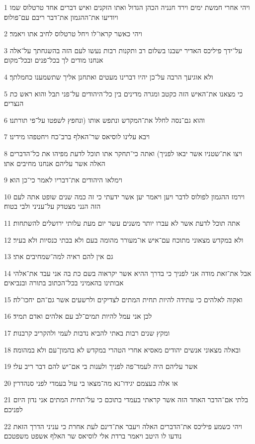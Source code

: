 \par 1 ויהי אחרי חמשת ימים וירד חנניה הכהן הגדול ואתו הזקנים ואיש דברים אחד טרטלוס שמו ויודיעו את־ההגמון את־דבר ריבם עם־פולוס׃
\par 2 ויהי כאשר קראו־לו ויחל טרטלוס לחיב אתו ויאמר׃
\par 3 על־ידך פיליכס האדיר ישבנו בשלום רב ותקנות רבות נעשו לעם הזה בהשגחתך על־אלה אנחנו מודים לך בכל־פנים ובכל־מקום׃
\par 4 ולא אוגיעך הרבה על־כן יהיו דברינו מעטים ואתחנן אליך שתשמענו כחמלתך׃
\par 5 כי מצאנו את־האיש הזה כקטב ומגרה מדינים בין כל־היהודים על־פני תבל והוא ראש כת הנצרים׃
\par 6 והוא גם־נסה לחלל את־המקדש ונתפש אותו (ונחפץ לשפטו על־פי תורתנו׃
\par 7 ויבא עלינו לוסיאס שר־האלף ברב־כח ויחטפהו מידינו׃
\par 8 ויצו את־שטניו אשר יבאו לפניך) ואתה כי־תחקר אתו תוכל לדעת מפיהו את כל־הדברים האלה אשר עליהם אנחנו מחיבים אתו׃
\par 9 וימלאו היהודים את־דבריו לאמר כי־כן הוא׃
\par 10 וירמז ההגמון לפולוס לדבר ויען ויאמר יען אשר ידעתי כי זה כמה שנים שופט אתה לעם הזה הנני מצטדק על־עניני ולבי בטוח׃
\par 11 אתה תוכל לדעת אשר לא עברו יותר משנים עשר יום מעת עלותי ירושלים להשתחות׃
\par 12 ולא במקדש מצאוני מתוכח עם־איש או־מעורר מהומה בעם ולא בבתי כנסיות ולא בעיר׃
\par 13 גם אין להם ראיה למה־שמחיבים אתי׃
\par 14 אבל את־זאת מודה אני לפניך כי בדרך ההיא אשר יקראוה בשם כת בה אני עבד את־אלהי אבותינו בהאמיני בכל־הכתוב בתורה ובנביאים׃
\par 15 ואקוה לאלהים כי עתידה להיות תחית המתים לצדיקים ולרשעים אשר גם־הם יחכו־לה׃
\par 16 לכן אני עמל להיות תמים־לב עם אלהים ואדם תמיד׃
\par 17 ומקץ שנים רבות באתי להביא נדבות לעמי ולהקריב קרבנות׃
\par 18 ובאלה מצאוני אנשים יהודים מאסיא אחרי הטהרי במקדש לא בהמון־עם ולא במהומה׃
\par 19 אשר עליהם היה לעמד־פה לפניך ולענות בי אם־יש להם דבר ריב עלי׃
\par 20 או אלה בעצמם יגידו־נא מה־מצאו בי עול בעמדי לפני סנהדרין׃
\par 21 בלתי אם־הדבר האחד הזה אשר קראתי בעמדי בתוכם כי על־תחית המתים אני נדון היום לפניכם׃
\par 22 ויהי כשמע פיליכס את־הדברים האלה ויעבר את־דינם לעת אחרת כי עניני הדרך הזאת נודעו לו היטב ויאמר ברדת אלי לוסיאס שר האלף אשפט משפטכם׃
